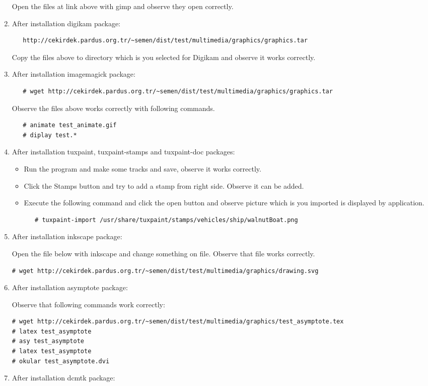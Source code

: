 \documentclass[a4paper,10pt]{article}
\begin{document}
\begin{enumerate}
 Open the files at link above with gimp and observe they open correctly.
\item After installation digikam package:

  \begin{verbatim}
   http://cekirdek.pardus.org.tr/~semen/dist/test/multimedia/graphics/graphics.tar
  \end{verbatim}

 Copy the files above to directory which is you selected for Digikam and observe it works correctly.
\item After installation imagemagick package:
  \begin{verbatim}
   # wget http://cekirdek.pardus.org.tr/~semen/dist/test/multimedia/graphics/graphics.tar
  \end{verbatim}

Observe the files above works correctly with following commands.
  \begin{verbatim}
   # animate test_animate.gif
   # diplay test.*
  \end{verbatim}
\item After installation tuxpaint, tuxpaint-stamps and tuxpaint-doc packages:
  \begin{itemize}
   \item  Run the program and make some tracks and save, observe it works correctly.
   \item Click the Stamps button and try to add a stamp from right side. Observe it can be added.
   \item Execute the following command and click the open button and observe picture which is you imported is displayed by application.
\begin{verbatim}
   # tuxpaint-import /usr/share/tuxpaint/stamps/vehicles/ship/walnutBoat.png
\end{verbatim} 
\end{itemize}

\item After installation inkscape package:

Open the file below with inkscape and change something on file. Observe that file works correctly.
\begin{verbatim}
# wget http://cekirdek.pardus.org.tr/~semen/dist/test/multimedia/graphics/drawing.svg 
\end{verbatim}

\item After installation asymptote package:

Observe that following commands work correctly:
\begin{verbatim}
# wget http://cekirdek.pardus.org.tr/~semen/dist/test/multimedia/graphics/test_asymptote.tex
# latex test_asymptote
# asy test_asymptote
# latex test_asymptote
# okular test_asymptote.dvi
\end{verbatim}
\item  After installation dcmtk package:


\end{enumerate}
\end{document}
